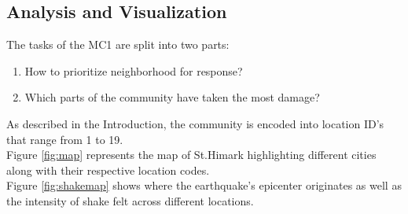 \documentclass[12pt]{extarticle}
\begin{document}
 
\begin{centering}
	\section{Analysis and Visualization}
\end{centering}
The tasks of the MC1 are split into two parts: \\

\begin{enumerate}[itemsep=0mm]
	\item How to prioritize neighborhood for response?
	\item Which parts of the community have taken the most damage?
\end{enumerate}
\noindent
As described in the Introduction, the community is encoded into location ID's that range from 1 to 19.  \\
Figure \ref{fig:map} represents the map of St.Himark highlighting different cities along with their respective location codes. \\
Figure \ref{fig:shakemap} shows where the earthquake's epicenter originates as well as the intensity of shake felt across different locations. 
\end{document}
